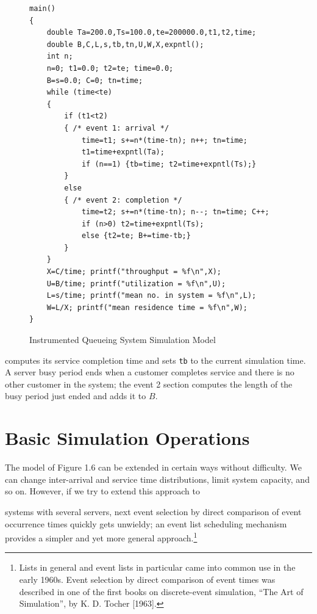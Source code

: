 \begin{figure}[H]
\centering
\begin{minipage}{.96\textwidth}
\begin{verbatim}
main()
{
    double Ta=200.0,Ts=100.0,te=200000.0,t1,t2,time;
    double B,C,L,s,tb,tn,U,W,X,expntl();
    int n;
    n=0; t1=0.0; t2=te; time=0.0;
    B=s=0.0; C=0; tn=time;
    while (time<te)
    {
        if (t1<t2)
        { /* event 1: arrival */
            time=t1; s+=n*(time-tn); n++; tn=time;
            t1=time+expntl(Ta);
            if (n==1) {tb=time; t2=time+expntl(Ts);}
        }
        else
        { /* event 2: completion */
            time=t2; s+=n*(time-tn); n--; tn=time; C++;
            if (n>0) t2=time+expntl(Ts);
            else {t2=te; B+=time-tb;}
        }
    }
    X=C/time; printf("throughput = %f\n",X);
    U=B/time; printf("utilization = %f\n",U);
    L=s/time; printf("mean no. in system = %f\n",L);
    W=L/X; printf("mean residence time = %f\n",W);
}
\end{verbatim}
\end{minipage}
\caption{Instrumented Queueing System Simulation Model}
\end{figure}
\noindent computes its service completion time and sets \texttt{tb} to the current
simulation time. A server busy period ends when a customer completes service
and there is no other customer in the system; the event 2 section computes the
length of the busy period just ended and adds it to $B$.

\section{Basic Simulation Operations}
\label{sec:basic-simulation-operations}
The model of Figure 1.6 can be extended in certain ways without difficulty. We
can change inter-arrival and service time distributions, limit system capacity,
and so on. However, if we try to extend this approach to

\noindent systems with several servers, next event selection by direct comparison of
event occurrence times quickly gets unwieldy; an event list scheduling mechanism
provides a simpler and yet more general approach.\footnote{Lists in general and
event lists in particular came into common use in the early 1960s. Event
selection by direct comparison of event times was described in one of the first
books on discrete-event simulation, ``The Art of Simulation'', by K. D. Tocher
[1963].}

